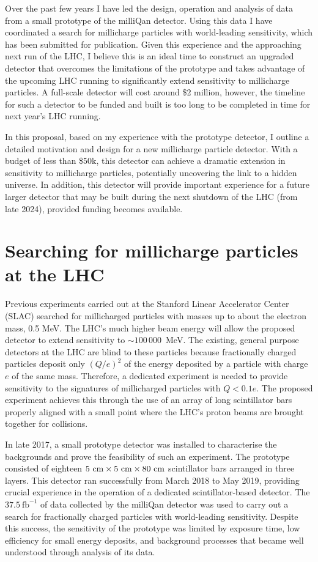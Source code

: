 \documentclass[11pt]{article}
\theoremstyle{plain} \numberwithin{equation}{section}
\theoremstyle{definition}
\begin{document}
Over the past few years I have led the design, operation and analysis
of data from a small prototype of the milliQan detector. Using this data I have coordinated
a search for millicharge particles with world-leading sensitivity, which has been submitted 
for publication. Given this experience and the approaching next run of the LHC, I believe this is an ideal 
time to construct an upgraded detector that overcomes the limitations of the prototype and takes 
advantage of the upcoming LHC running to significantly extend sensitivity to millicharge particles. A full-scale 
detector will cost around \$2 million, however, the timeline for such a detector to be funded and built
is too long to be completed in time for next year's LHC running.  

In this proposal, based on my experience with the prototype detector,
I outline a detailed motivation and design 
for a new millicharge particle detector.
With a budget of less than \$50k, this detector can 
achieve a dramatic extension in sensitivity 
to millicharge particles, potentially uncovering the link
to a hidden universe.
In addition, this detector will provide 
important experience for a future larger detector
that may be built during the next shutdown of the LHC (from late 2024), 
provided funding becomes available.

%
\section*{Searching for millicharge particles at the LHC}
%
Previous experiments carried out at the Stanford Linear Accelerator Center (SLAC) 
searched for millicharged particles with masses up to about the electron mass, 0.5 MeV.
The LHC's much higher beam energy will allow the proposed detector to extend 
sensitivity to $\sim 100\,000$~MeV.
The existing, general purpose detectors at the LHC are blind to these particles because 
fractionally charged particles deposit only $(Q/e)^2$ of the energy 
deposited by a particle with charge $e$ of
the same mass. Therefore, a dedicated experiment is needed to provide sensitivity to the signatures of 
millicharged particles with $Q< 0.1 e$.
The proposed experiment achieves this through the use of an array of long scintillator
bars properly aligned with a small point where the LHC's proton beams are brought together for collisions. 

In late 2017, a small prototype detector was installed to characterise 
the backgrounds and prove the feasibility of such an experiment.
The prototype consisted of eighteen $5~\rm{cm}\times5~\rm{cm}\times80~\rm{cm}$ 
scintillator bars arranged in three layers. This detector ran successfully 
from March 2018 to May 2019, providing crucial
experience in the operation of a dedicated scintillator-based detector. 
The $37.5~\text{fb}^{-1}$ of data collected by the milliQan detector was used to carry out
a search for fractionally charged particles with world-leading sensitivity.
Despite this success, the sensitivity of the prototype was limited by exposure time, 
low efficiency for small energy deposits,
and background processes that became well understood through analysis of its data.
\end{document}
